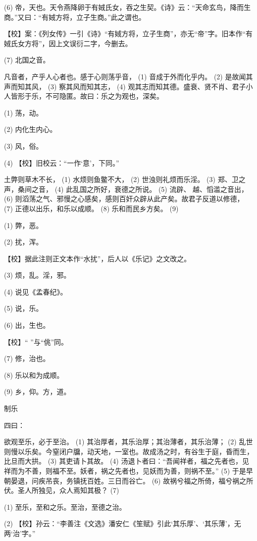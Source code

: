 \documentclass[12pt,UTF8]{ctexbook}
\begin{document}
(6) 帝，天也。天令燕降卵于有娀氏女，吞之生契。《诗》云：“天命玄鸟，降而生商。”又曰：“有娀方将，立子生商。”此之谓也。

【校】案：《列女传》一引《诗》“有娀方将，立子生商”，亦无“帝”字。旧本作“有娀氏女方将”，因上文误衍二字，今删去。

(7) 北国之音。

凡音者，产乎人心者也。感于心则荡乎音， (1) 音成于外而化乎内。 (2) 是故闻其声而知其风， (3) 察其风而知其志， (4) 观其志而知其德。盛衰、贤不肖、君子小人皆形于乐，不可隐匿。故曰：乐之为观也，深矣。

(1) 荡，动。

(2) 内化生内心。

(3) 风，俗。

(4) 【校】旧校云：“一作‘意’，下同。”

土弊则草木不长， (1) 水烦则鱼鳖不大， (2) 世浊则礼烦而乐淫。 (3) 郑、卫之声，桑间之音， (4) 此乱国之所好，衰德之所说。 (5) 流辟、 越、慆滥之音出， (6) 则滔荡之气、邪慢之心感矣，感则百奸众辟从此产矣。故君子反道以修德， (7) 正德以出乐，和乐以成顺。 (8) 乐和而民乡方矣。 (9)

(1) 弊，恶。

(2) 扰，浑。

【校】据此注则正文本作“水扰”，后人以《乐记》之文改之。

(3) 烦，乱。淫，邪。

(4) 说见《孟春纪》。

(5) 说，乐。

(6) 出，生也。

【校】“ ”与“佻”同。

(7) 修，治也。

(8) 乐以和为成顺。

(9) 乡，仰。方，道。





制乐


四曰：

欲观至乐，必于至治。 (1) 其治厚者，其乐治厚；其治薄者，其乐治薄； (2) 乱世则慢以乐矣。今窒闭户牖，动天地，一室也。故成汤之时，有谷生于庭，昏而生，比旦而大拱。 (3) 其吏请卜其故。 (4) 汤退卜者曰：“吾闻祥者，福之先者也，见祥而为不善，则福不至。妖者，祸之先者也，见妖而为善，则祸不至。” (5) 于是早朝晏退，问疾吊丧，务镇抚百姓。三日而谷亡。 (6) 故祸兮福之所倚，福兮祸之所伏。圣人所独见，众人焉知其极？ (7)

(1) 至乐，至和之乐。至治，至德之治。

(2) 【校】孙云：“李善注《文选》潘安仁《笙赋》引此‘其乐厚’、‘其乐薄’，无两‘治’字。”
\end{document}
